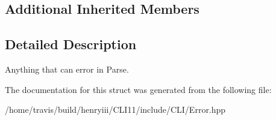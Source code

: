\subsection*{Additional Inherited Members}


\subsection{Detailed Description}
Anything that can error in Parse. 

The documentation for this struct was generated from the following file\+:\begin{DoxyCompactItemize}
\item 
/home/travis/build/henryiii/\+C\+L\+I11/include/\+C\+L\+I/Error.\+hpp\end{DoxyCompactItemize}
